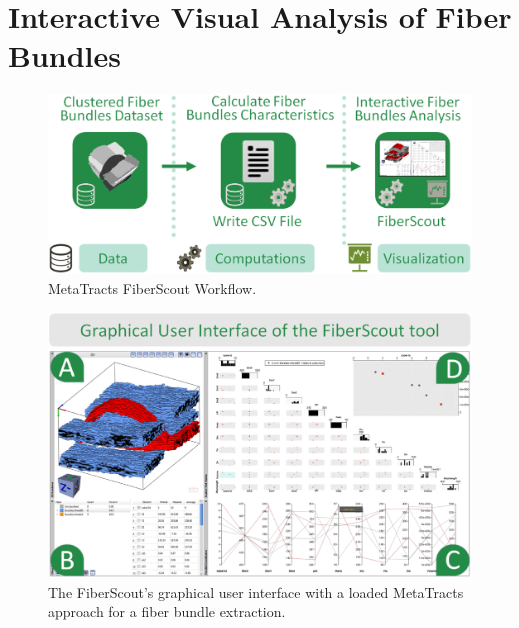 \section{Interactive Visual Analysis of Fiber Bundles}
\begin{figure}[htb]
	\centering
	\includegraphics[width=\linewidth]{images/MetaTractsToFiberScout_workflow.eps}
	\caption{MetaTracts FiberScout Workflow. }
	\label{fig:flowchart}
\end{figure}

\begin{figure}[htb]
	\centering
	\includegraphics[width=\linewidth]{images/FiberScout_GUI.eps}
	\caption{The FiberScout's graphical user interface with a loaded MetaTracts approach for a fiber bundle extraction. }
	\label{fig:flowchart}
\end{figure}
